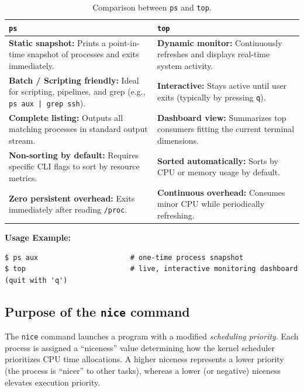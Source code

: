 \documentclass[11pt,a4paper]{article}
\begin{document}
\begin{table}[h!]
\centering
\small
\begin{tabular}{@{}p{}p{}@{}}
\toprule
\textbf{\texttt{ps}} & \textbf{\texttt{top}} \\
\midrule
\textbf{Static snapshot:} Prints a point-in-time snapshot of processes and exits immediately. & 
\textbf{Dynamic monitor:} Continuously refreshes and displays real-time system activity. \\
\addlinespace
\textbf{Batch / Scripting friendly:} Ideal for scripting, pipelines, and grep (e.g., \texttt{ps aux | grep ssh}). & 
\textbf{Interactive:} Stays active until user exits (typically by pressing \texttt{q}). \\
\addlinespace
\textbf{Complete listing:} Outputs all matching processes in standard output stream. & 
\textbf{Dashboard view:} Summarizes top consumers fitting the current terminal dimensions. \\
\addlinespace
\textbf{Non-sorting by default:} Requires specific CLI flags to sort by resource metrics. & 
\textbf{Sorted automatically:} Sorts by CPU or memory usage by default. \\
\addlinespace
\textbf{Zero persistent overhead:} Exits immediately after reading \texttt{/proc}. & 
\textbf{Continuous overhead:} Consumes minor CPU while periodically refreshing. \\
\bottomrule
\end{tabular}
\caption{Comparison between \texttt{ps} and \texttt{top}.}
\end{table}

\noindent\textbf{Usage Example:}
\begin{lstlisting}[style=bashstyle]
$ ps aux                      # one-time process snapshot
$ top                         # live, interactive monitoring dashboard (quit with 'q')
\end{lstlisting}

\subsection{Purpose of the \texttt{nice} command}

The \texttt{nice} command launches a program with a modified \emph{scheduling priority}. Each process is assigned a ``niceness'' value determining how the kernel scheduler prioritizes CPU time allocations. A higher niceness represents a lower priority (the process is ``nicer'' to other tasks), whereas a lower (or negative) niceness elevates execution priority.
\end{document}
